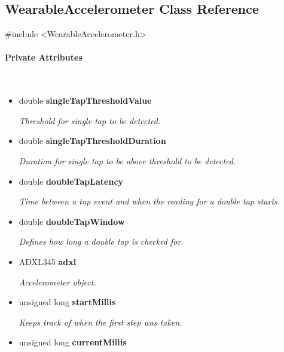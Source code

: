 \subsection{WearableAccelerometer Class Reference}
\label{subsec:WearableAccelerometer}\mbox{}

    \ttfamily{}

    \#include <WearableAccelerometer.h>\\

    \rmfamily{}

    \paragraph{Private Attributes}\mbox{}\\

        \begin{itemize}
            \item double \textbf{singleTapThresholdValue}
            
                \quad \quad \textit{Threshold for single tap to be detected.}

            \item double \textbf{singleTapThresholdDuration}
            
                \quad \quad \textit{Duration for single tap to be above threshold to be detected.}

            \item double \textbf{doubleTapLatency}
            
                \quad \quad \textit{Time between a tap event and when the reading for a double tap starts.}

            \item double \textbf{doubleTapWindow}
            
                \quad \quad \textit{Defines how long a double tap is checked for.}

            \item ADXL345 \textbf{adxl}
            
                \quad \quad \textit{Accelerometer object.}

            \item unsigned long \textbf{startMillis}
            
                \quad \quad \textit{Keeps track of when the first step was taken.}

            \item unsigned long \textbf{currentMillis}
            

\end{itemize}
